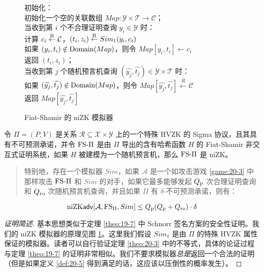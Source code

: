 \begin{figure}
  \hspace*{95pt} 初始化：\\
  \hspace*{120pt} 初始化一个空的关联数组 $Map:\mathcal{Y}\times\mathcal{T}\to\mathcal{C}$；\\
  \hspace*{95pt} 当收到第 $i$ 个不合理证明查询 $y_i\in\mathcal{Y}$ 时：\\
  \hspace*{120pt} 计算 $c_i\overset{\rm R}\leftarrow\mathcal{C}$，$(t_i,z_i)\overset{\rm R}\leftarrow Sim_1(y_i,c_i)$\\
  \hspace*{120pt} 如果 $(y_i,t_i)\notin{\rm Domain}(Map)$，则令 $Map[y_i,t_i]\leftarrow c_i$\\
  \hspace*{120pt} 返回 $(t_i,z_i)$；\\
  \hspace*{95pt} 当收到第 $j$ 个随机预言机查询 $(\widehat{y_j},\widehat{t_j})\in\mathcal{Y}\times\mathcal{T}$ 时：\\
  \hspace*{120pt} 如果 $(\widehat{y_j},\widehat{t_j})\notin{\rm Domain}(Map)$，则令 $Map[\widehat{y_j},\widehat{t_j}]\overset{R}\leftarrow\mathcal{C}$\\
  \hspace*{120pt} 返回 $Map[\widehat{y_j},\widehat{t_j}]$
  \caption{Fiat-Shamir 的 niZK 模拟器}
  \label{fig:20-2}
\end{figure}

\begin{theorem}\label{theo:20-3}
令 $\Pi=(P,V)$ 是关系 $\mathcal{R}\subseteq\mathcal{X}\times\mathcal{Y}$ 上的一个特殊 HVZK 的 Sigma 协议，且其具有不可预测承诺，并令 ${\rm FS}\text{-}\Pi$ 是由 $\Pi$ 导出的含有哈希函数 $H$ 的 Fiat-Shamir 非交互式证明系统，如果 $H$ 被建模为一个随机预言机，那么 ${\rm FS}\text{-}\Pi$ 是 niZK。
\begin{quote}
特别地，存在一个模拟器 $Sim$，如果 $\mathcal{A}$ 是一个如攻击游戏 \ref{game:20-3} 中那样攻击 ${\rm FS}\text{-}\Pi$ 和 $Sim$ 的对手，如果它最多能够发起 $Q_{\rm p}$ 次合理证明查询和 $Q_{\rm ro}$ 次随机预言机查询，并且如果 $\Pi$ 有 $\delta$-不可预测承诺，则有：
\end{quote}
\begin{equation}
{\rm niZK\mathsf{adv}}[\mathcal{A},{\rm FS}_\Pi,Sim]\leq Q_{\rm p}(Q_{\rm p}+Q_{\rm ro})\cdot\delta
\end{equation}
\end{theorem}

\begin{proof}[证明简述]
基本思想类似于定理 \ref{theo:19-7} 中 Schnorr 签名方案的安全性证明。我们的 niZK 模拟器的原理见图 \ref{fig:20-2}。这里我们假设 $Sim_1$ 是由 $\Pi$ 的特殊 HVZK 属性保证的模拟器。读者可以自行验证定理 \ref{theo:20-3} 中的不等式，具体的论证过程与定理 \ref{theo:19-7} 的证明非常相似。我们不要求模拟器\emph{总是}返回一个合法的证明（但是如果定义 \ref{def:20-5} 得到满足的话，这应该以压倒性的概率发生）。
\end{proof}
